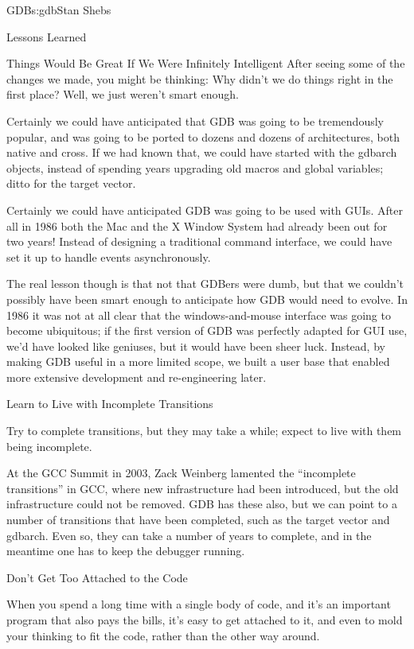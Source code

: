 \begin{aosachapter}{GDB}{s:gdb}{Stan Shebs}
\begin{aosasect1}{Lessons Learned}
\begin{aosasect2}{Things Would Be Great If We Were Infinitely Intelligent}
After seeing some of the changes we made, you might be thinking: Why
didn't we do things right in the first place?  Well, we just weren't
smart enough.

Certainly we could have anticipated that GDB was going to be
tremendously popular, and was going to be ported to dozens and dozens
of architectures, both native and cross.  If we had known that, we
could have started with the gdbarch objects, instead of spending years
upgrading old macros and global variables;  ditto for the target
vector.

Certainly we could have anticipated GDB was going to be used with
GUIs. After all in 1986 both the Mac and the X Window System had
already been out for two years!  Instead of designing a traditional
command interface, we could have set it up to handle events
asynchronously.

The real lesson though is that not that GDBers were dumb, but that we
couldn't possibly have been smart enough to anticipate how GDB would
need to evolve.  In 1986 it was not at all clear that the
windows-and-mouse interface was going to become ubiquitous; if the
first version of GDB was perfectly adapted for GUI use, we'd have
looked like geniuses, but it would have been sheer luck.  Instead,
by making GDB useful in a more limited scope, we built a user base
that enabled more extensive development and re-engineering later.

\end{aosasect2}

\begin{aosasect2}{Learn to Live with Incomplete Transitions}

Try to complete transitions, but they may take a while; expect to live
with them being incomplete.

At the GCC Summit in 2003, Zack Weinberg lamented the ``incomplete
transitions'' in GCC, where new infrastructure had been introduced,
but the old infrastructure could not be removed.  GDB has these also,
but we can point to a number of transitions that have been completed,
such as the target vector and gdbarch.  Even so, they can take a
number of years to complete, and in the meantime one has to keep the
debugger running.

\end{aosasect2}

\begin{aosasect2}{Don't Get Too Attached to the Code}

When you spend a long time with a single body of code, and it's an
important program that also pays the bills, it's easy to get attached
to it, and even to mold your thinking to fit the code, rather than the
other way around.


\end{aosasect2}
\end{aosasect1}
\end{aosachapter}
